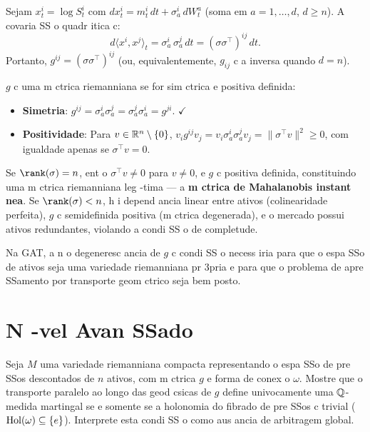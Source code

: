 \begin{sol}
Sejam $x^i_t = \log S^i_t$ com $dx^i_t = m^i_t\,dt + \sigma^i_a\,dW^a_t$ (soma em $a=1,\dots,d$, $d\geq n$). A covaria SS o quadr itica c:
\begin{equation}
 d\langle x^i, x^j\rangle_t = \sigma^i_a\,\sigma^j_a\,dt = (\sigma\sigma^\top)^{ij}\,dt.
\end{equation}
Portanto, $g^{ij} = (\sigma\sigma^\top)^{ij}$ (ou, equivalentemente, $g_{ij}$ c a inversa quando $d=n$).

$g$ c uma m ctrica riemanniana se for sim ctrica e positiva definida:
\begin{itemize}
 \item \textbf{Simetria}: $g^{ij} = \sigma^i_a\sigma^j_a = \sigma^j_a\sigma^i_a = g^{ji}$. $\checkmark$
 \item \textbf{Positividade}: Para $v\in\mathbb{R}^n\setminus\{0\}$, $v_i g^{ij} v_j = v_i\sigma^i_a\sigma^j_a v_j = \|\sigma^\top v\|^2 \geq 0$, com igualdade apenas se $\sigma^\top v = 0$.
\end{itemize}

Se $\rank(\sigma)=n$, ent o $\sigma^\top v \neq 0$ para $v\neq 0$, e $g$ c positiva definida, constituindo uma m ctrica riemanniana leg -tima --- a \textbf{m ctrica de Mahalanobis instant nea}. Se $\rank(\sigma)<n$, h i depend ancia linear entre ativos (colinearidade perfeita), $g$ c semidefinida positiva (m ctrica degenerada), e o mercado possui ativos redundantes, violando a condi SS o de completude.

Na GAT, a n o degeneresc ancia de $g$ c condi SS o necess iria para que o espa SSo de ativos seja uma variedade riemanniana pr 3pria e para que o problema de apre SSamento por transporte geom ctrico seja bem posto.
\end{sol}

\section{N -vel Avan SSado}
\label{sec:ex_avancado}

\begin{exer}
\label{ex:transporte_medida}
Seja $M$ uma variedade riemanniana compacta representando o espa SSo de pre SSos descontados de $n$ ativos, com m ctrica $g$ e forma de conex o $\omega$. Mostre que o transporte paralelo ao longo das geod csicas de $g$ define univocamente uma $\mathbb{Q}$-medida martingal se e somente se a holonomia do fibrado de pre SSos c trivial ($\operatorname{Hol}(\omega)\subseteq\{e\}$). Interprete esta condi SS o como aus ancia de arbitragem global.
\end{exer}


